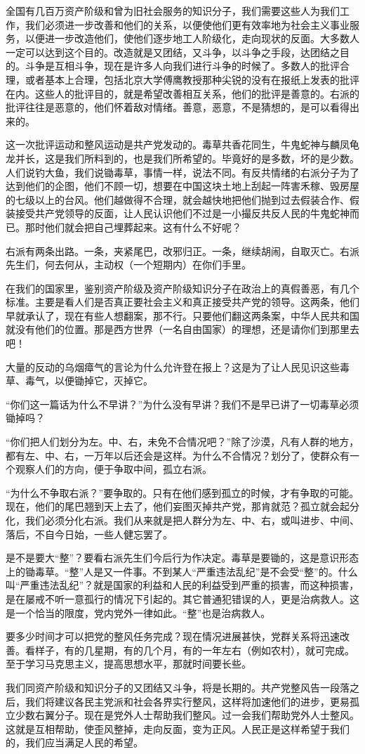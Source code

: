 全国有几百万资产阶级和曾为旧社会服务的知识分子，我们需要这些人为我们工作，我们必须进一步改善和他们的关系，以便使他们更有效率地为社会主义事业服务，以便进一步改造他们，使他们逐步地工人阶级化，走向现状的反面。大多数人一定可以达到这个目的。改造就是又团结，又斗争，以斗争之手段，达团结之目的。斗争是互相斗争，现在是许多人向我们进行斗争的时候了。多数人的批评合理，或者基本上合理，包括北京大学傅鹰教授那种尖锐的没有在报纸上发表的批评在内。这些人的批评目的，就是希望改善相互关系，他们的批评是善意的。右派的批评往往是恶意的，他们怀着敌对情绪。善意，恶意，不是猜想的，是可以看得出来的。

这一次批评运动和整风运动是共产党发动的。毒草共香花同生，牛鬼蛇神与麟凤龟龙并长，这是我们所料到的，也是我们所希望的。毕竟好的是多数，坏的是少数。人们说钓大鱼，我们说锄毒草，事情一样，说法不同。有反共情绪的右派分子为了达到他们的企图，他们不顾一切，想要在中国这块土地上刮起一阵害禾稼、毁房屋的七级以上的台风。他们越做得不合理，就会越快地把他们抛到过去假装合作、假装接受共产党领导的反面，让人民认识他们不过是一小撮反共反人民的牛鬼蛇神而已。那时他们就会把自己埋葬起来。这有什么不好呢？

右派有两条出路。一条，夹紧尾巴，改邪归正。一条，继续胡闹，自取灭亡。右派先生们，何去何从，主动权（一个短期内）在你们手里。

在我们的国家里，鉴别资产阶级及资产阶级知识分子在政治上的真假善恶，有几个标准。主要是看人们是否真正要社会主义和真正接受共产党的领导。这两条，他们早就承认了，现在有些人想翻案，那不行。只要他们翻这两条案，中华人民共和国就没有他们的位置。那是西方世界（一名自由国家）的理想，还是请你们到那里去吧！

大量的反动的乌烟瘴气的言论为什么允许登在报上？这是为了让人民见识这些毒草、毒气，以便锄掉它，灭掉它。

“你们这一篇话为什么不早讲？”为什么没有早讲？我们不是早已讲了一切毒草必须锄掉吗？

“你们把人们划分为左。中、右，未免不合情况吧？”除了沙漠，凡有人群的地方，都有左、中、右，一万年以后还会是这样。为什么不合情况？划分了，使群众有一个观察人们的方向，便于争取中间，孤立右派。

“为什么不争取右派？”要争取的。只有在他们感到孤立的时候，才有争取的可能。现在，他们的尾巴翘到天上去了，他们妄图灭掉共产党，那肯就范？孤立就会起分化，我们必须分化右派。我们从来就是把人群分为左、中、右，或叫进步、中间、落后，不自今日始，一些人健忘罢了。

是不是要大“整”？要看右派先生们今后行为作决定。毒草是要锄的，这是意识形态上的锄毒草。“整”人是又一件事。不到某人“严重违法乱纪”是不会受“整”的。什么叫“严重违法乱纪”？就是国家的利益和人民的利益受到严重的损害，而这种损害，是在屡戒不听一意孤行的情况下引起的。其它普通犯错误的人，更是治病救人。这是一个恰当的限度，党内党外一律如此。“整”也是治病救人。

要多少时间才可以把党的整风任务完成？现在情况进展甚快，党群关系将迅速改善。看样子，有的几星期，有的几个月，有的一年左右（例如农村），就可完成。至于学习马克思主义，提高思想水平，那就时间要长些。

我们同资产阶级和知识分子的又团结又斗争，将是长期的。共产党整风告一段落之后，我们将建议各民主党派和社会各界实行整风，这样将加速他们的进步，更易孤立少数右翼分子。现在是党外人士帮助我们整风。过一会我们帮助党外人士整风。这就是互相帮助，使歪风整掉，走向反面，变为正风。人民正是这样希望于我们的，我们应当满足人民的希望。
